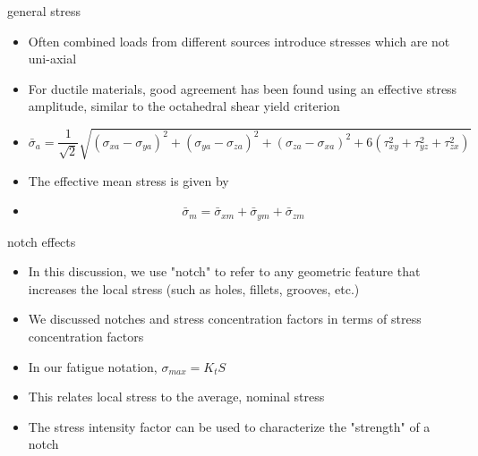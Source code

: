 \documentclass[10pt]{beamer}
\begin{document}
\begin{frame}{general stress}
	\begin{itemize}[<+->]
		\item Often combined loads from different sources introduce stresses which are not uni-axial
		\item For ductile materials, good agreement has been found using an effective stress amplitude, similar to the octahedral shear yield criterion
		\item[] \begin{equation}
		\bar{\sigma}_a = \frac{1}{\sqrt{2}}\sqrt{(\sigma_{xa}-\sigma_{ya})^2 + (\sigma_{ya}-\sigma_{za})^2 + (\sigma_{za}-\sigma_{xa})^2 + 6(\tau_{xy}^2 + \tau_{yz}^2 + \tau_{zx}^2)}
		\end{equation}
		\item The effective mean stress is given by
		\item[] \begin{equation}
		\bar{\sigma}_m = \bar{\sigma}_{xm} + \bar{\sigma}_{ym} + \bar{\sigma}_{zm}
		\end{equation}
	\end{itemize}
\end{frame}

\begin{frame}{notch effects}
	\begin{itemize}[<+->]
		\item In this discussion, we use "notch" to refer to any geometric feature that increases the local stress (such as holes, fillets, grooves, etc.)
		\item We discussed notches and stress concentration factors in terms of stress concentration factors
		\item In our fatigue notation, $\sigma_{max} = K_t S$
		\item This relates local stress to the average, nominal stress
		\item The stress intensity factor can be used to characterize the "strength" of a notch
	\end{itemize}
\end{frame}
\end{document}
